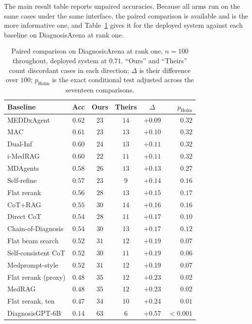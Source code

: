 \documentclass[letterpaper]{article}
\begin{document}
The main result table reports unpaired accuracies.
Because all arms run on the same cases under the same interface, the paired comparison is available and is the more informative one, and Table~\ref{tab:rec-paired} gives it for the deployed system against each baseline on DiagnosisArena at rank one.

\begin{table}[tb]
\centering
\footnotesize
\setlength{\tabcolsep}{2.5pt}
\begin{tabular}{@{}lccccr@{}}
\toprule
Baseline & Acc & Ours & Theirs & $\Delta$ & $p_{\mathrm{Holm}}$ \\
\midrule
MEDDxAgent          & $0.62$ & $23$ & $14$ & $+0.09$ & $0.32$ \\
MAC                 & $0.61$ & $23$ & $13$ & $+0.10$ & $0.32$ \\
Dual-Inf            & $0.60$ & $24$ & $13$ & $+0.11$ & $0.32$ \\
i-MedRAG            & $0.60$ & $22$ & $11$ & $+0.11$ & $0.32$ \\
MDAgents            & $0.58$ & $26$ & $13$ & $+0.13$ & $0.27$ \\
Self-refine         & $0.57$ & $23$ & $9$  & $+0.14$ & $0.16$ \\
Flat rerank         & $0.56$ & $28$ & $13$ & $+0.15$ & $0.17$ \\
CoT+RAG             & $0.55$ & $30$ & $14$ & $+0.16$ & $0.16$ \\
Direct CoT          & $0.54$ & $28$ & $11$ & $+0.17$ & $0.10$ \\
Chain-of-Diagnosis  & $0.54$ & $30$ & $13$ & $+0.17$ & $0.12$ \\
Flat beam search    & $0.52$ & $31$ & $12$ & $+0.19$ & $0.07$ \\
Self-consistent CoT & $0.52$ & $30$ & $11$ & $+0.19$ & $0.06$ \\
Medprompt-style     & $0.52$ & $31$ & $12$ & $+0.19$ & $0.07$ \\
Flat rerank (proxy) & $0.48$ & $35$ & $12$ & $+0.23$ & $0.02$ \\
MedRAG              & $0.48$ & $35$ & $12$ & $+0.23$ & $0.02$ \\
Flat rerank, ten    & $0.47$ & $34$ & $10$ & $+0.24$ & $0.01$ \\
DiagnosisGPT-6B     & $0.14$ & $63$ & $6$  & $+0.57$ & ${<}0.001$ \\
\bottomrule
\end{tabular}
\caption{Paired comparison on DiagnosisArena at rank one, $n{=}100$ throughout, deployed system at $0.71$. ``Ours'' and ``Theirs'' count discordant cases in each direction; $\Delta$ is their difference over $100$; $p_{\mathrm{Holm}}$ is the exact conditional test adjusted across the seventeen comparisons.}
\label{tab:rec-paired}
\end{table}
\end{document}
